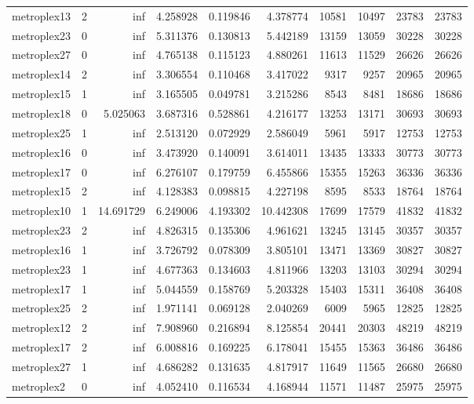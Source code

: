 \begin{longtable}{|l|r|r|r|r|r|r|r|r|r|}
metroplex13 & 2 & inf & 4.258928 & 0.119846 & 4.378774 & 10581 & 10497 & 23783 & 23783 \\
metroplex23 & 0 & inf & 5.311376 & 0.130813 & 5.442189 & 13159 & 13059 & 30228 & 30228 \\
metroplex27 & 0 & inf & 4.765138 & 0.115123 & 4.880261 & 11613 & 11529 & 26626 & 26626 \\
metroplex14 & 2 & inf & 3.306554 & 0.110468 & 3.417022 & 9317 & 9257 & 20965 & 20965 \\
metroplex15 & 1 & inf & 3.165505 & 0.049781 & 3.215286 & 8543 & 8481 & 18686 & 18686 \\
metroplex18 & 0 & 5.025063 & 3.687316 & 0.528861 & 4.216177 & 13253 & 13171 & 30693 & 30693 \\
metroplex25 & 1 & inf & 2.513120 & 0.072929 & 2.586049 & 5961 & 5917 & 12753 & 12753 \\
metroplex16 & 0 & inf & 3.473920 & 0.140091 & 3.614011 & 13435 & 13333 & 30773 & 30773 \\
metroplex17 & 0 & inf & 6.276107 & 0.179759 & 6.455866 & 15355 & 15263 & 36336 & 36336 \\
metroplex15 & 2 & inf & 4.128383 & 0.098815 & 4.227198 & 8595 & 8533 & 18764 & 18764 \\
metroplex10 & 1 & 14.691729 & 6.249006 & 4.193302 & 10.442308 & 17699 & 17579 & 41832 & 41832 \\
metroplex23 & 2 & inf & 4.826315 & 0.135306 & 4.961621 & 13245 & 13145 & 30357 & 30357 \\
metroplex16 & 1 & inf & 3.726792 & 0.078309 & 3.805101 & 13471 & 13369 & 30827 & 30827 \\
metroplex23 & 1 & inf & 4.677363 & 0.134603 & 4.811966 & 13203 & 13103 & 30294 & 30294 \\
metroplex17 & 1 & inf & 5.044559 & 0.158769 & 5.203328 & 15403 & 15311 & 36408 & 36408 \\
metroplex25 & 2 & inf & 1.971141 & 0.069128 & 2.040269 & 6009 & 5965 & 12825 & 12825 \\
metroplex12 & 2 & inf & 7.908960 & 0.216894 & 8.125854 & 20441 & 20303 & 48219 & 48219 \\
metroplex17 & 2 & inf & 6.008816 & 0.169225 & 6.178041 & 15455 & 15363 & 36486 & 36486 \\
metroplex27 & 1 & inf & 4.686282 & 0.131635 & 4.817917 & 11649 & 11565 & 26680 & 26680 \\
metroplex2 & 0 & inf & 4.052410 & 0.116534 & 4.168944 & 11571 & 11487 & 25975 & 25975 \\

\end{longtable}
